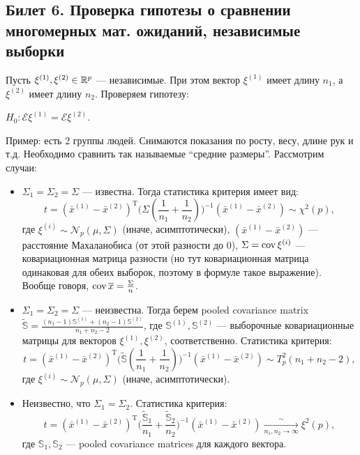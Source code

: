 \subsection{Билет 6. Проверка гипотезы о сравнении многомерных мат. ожиданий, независимые выборки}
Пусть $\xi^{(1)}, \xi^{(2)} \in \mathbb{R}^p$  --- независимые. При этом вектор $\xi^{(1)}$ имеет длину $n_1$, а $\xi^{(2)}$ имеет длину $n_2$. Проверяем гипотезу:

$H_0: \mathcal{E}\xi^{(1)} = \mathcal{E}\xi^{(2)}$.

Пример: есть 2 группы людей. Снимаются показания по росту, весу, длине рук и т.д. Необходимо сравнить так называемые ``средние размеры''. Рассмотрим случаи:
\begin{itemize}
\item $\Sigma_1 = \Sigma_2 = \Sigma$ --- известна. Тогда статистика критерия имеет вид:
%
\begin{equation*}
t = (\bar{x}^{(1)} - \bar{x}^{(2)})^{\mathrm{T}} \Big (\Sigma (\frac{1}{n_1} + \frac{1}{n_2}) \Big )^{-1} (\bar{x}^{(1)} - \bar{x}^{(2)}) \sim \chi^2 (p),
\end{equation*}
%
где $\xi^{(i)} \sim \mathcal{N}_p (\mu,\Sigma)$ (иначе, асимптотически), $(\bar{x}^{(1)} - \bar{x}^{(2)})$ --- расстояние Махаланобиса (от этой разности до 0), $\Sigma = \operatorname{cov} \xi^{(i)}$ --- ковариационная матрица разности (но тут ковариационная матрица одинаковая для обеих выборок, поэтому в формуле такое выражение). Вообще говоря, $\operatorname{cov} \overline{x} = \frac{\Sigma}{n}$.
\item $\Sigma_1 = \Sigma_2 = \Sigma$ --- неизвестна. Тогда берем pooled covariance matrix $\tilde{\mathbb{S}} = \frac{(n_1 - 1)\mathbb{S}^{(1)} + (n_2 - 1)\mathbb{S}^{(2)}}{n_1 + n_2 - 2}$, где $\mathbb{S}^{(1)}, \mathbb{S}^{(2)}$ --- выборочные ковариационные матрицы для векторов $\xi^{(1)}, \xi^{(2)}$, соответственно.
Статистика критерия:
%
\begin{equation*}
t = (\bar{x}^{(1)} - \bar{x}^{(2)})^{\mathrm{T}} \Big (\tilde{\mathbb{S}} (\frac{1}{n_1} +
\frac{1}{n_2}) \Big )^{-1} (\bar{x}^{(1)} - \bar{x}^{(2)}) \sim T_p^2 (n_1+n_2-2),
\end{equation*}
%
где $\xi^{(i)} \sim \mathcal{N}_p (\mu,\Sigma)$ (иначе, асимптотически).
\item Неизвестно, что $\Sigma_1 = \Sigma_2$.
Статистика критерия:
%
\begin{equation*}
t = (\bar{x}^{(1)} - \bar{x}^{(2)})^{\mathrm{T}} \Big (\frac{\tilde{\mathbb{S}}_1}{n_1} +
\frac{\tilde{\mathbb{S}}_2}{n_2} \Big )^{-1} (\bar{x}^{(1)} - \bar{x}^{(2)}) \xrightarrow[n_1, n_2
\rightarrow \infty]{\sim} \xi^2 (p),
\end{equation*}
%
где $\mathbb{S}_1, \mathbb{S}_2$ --- pooled covariance matrices для каждого вектора.
\end{itemize}
